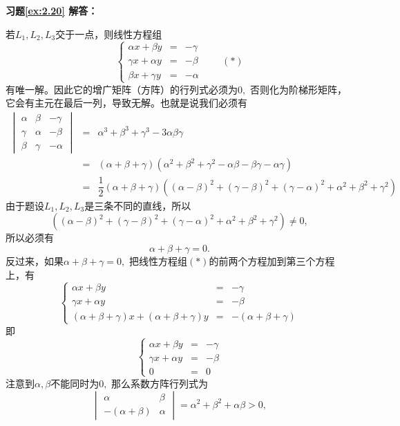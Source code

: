 \documentclass[a4paper]{book}
\begin{document}
\vspace{1.5em}

\textbf{习题\ref{ex:2.20} 解答：}

若$L_1, L_2, L_3$交于一点，则线性方程组
$$\left\{ \begin{array}{rcl} \alpha x + \beta y & = & -\gamma \\ \gamma x + \alpha y & = & -\beta \\ \beta x + \gamma y & = & -\alpha \end{array}\right. \qquad (\ast)$$
有唯一解。因此它的增广矩阵（方阵）的行列式必须为$0,$ 否则化为阶梯形矩阵，它会有主元在最后一列，导致无解。也就是说我们必须有
\begin{eqnarray*}
\begin{vmatrix}
\alpha & \beta & -\gamma \\ \gamma & \alpha & -\beta \\ \beta & \gamma & -\alpha \end{vmatrix} & = & \alpha^3 + \beta^3 + \gamma^3 - 3\alpha\beta\gamma \\
& = & (\alpha + \beta + \gamma)(\alpha^2 + \beta^2 + \gamma^2 - \alpha\beta - \beta\gamma - \alpha\gamma) \\
& = & \dfrac{1}{2}(\alpha + \beta + \gamma)((\alpha - \beta)^2 + (\gamma - \beta)^2 + (\gamma - \alpha)^2 + \alpha^2 + \beta^2 + \gamma^2)
\end{eqnarray*}
由于题设$L_1, L_2, L_3$是三条不同的直线，所以
$$((\alpha - \beta)^2 + (\gamma - \beta)^2 + (\gamma - \alpha)^2 + \alpha^2 + \beta^2 + \gamma^2)\neq 0,$$
所以必须有
$$\alpha + \beta + \gamma = 0.$$
反过来，如果$\alpha + \beta + \gamma = 0,$ 把线性方程组$(\ast)$的前两个方程加到第三个方程上，有
$$\left\{ \begin{array}{rcl} \alpha x + \beta y & = & -\gamma \\ \gamma x + \alpha y & = & -\beta \\ (\alpha + \beta + \gamma) x + (\alpha + \beta + \gamma) y & = & -(\alpha + \beta + \gamma) \end{array}\right.$$
即
$$\left\{ \begin{array}{rcl} \alpha x + \beta y & = & -\gamma \\ \gamma x + \alpha y & = & -\beta \\ 0 & = & 0 \end{array}\right.$$
注意到$\alpha,\beta$不能同时为$0,$ 那么系数方阵行列式为
$$\begin{vmatrix}
\alpha & \beta \\ -(\alpha+\beta) & \alpha \end{vmatrix} = \alpha^2 + \beta^2 + \alpha\beta >0,$$
\end{document}
